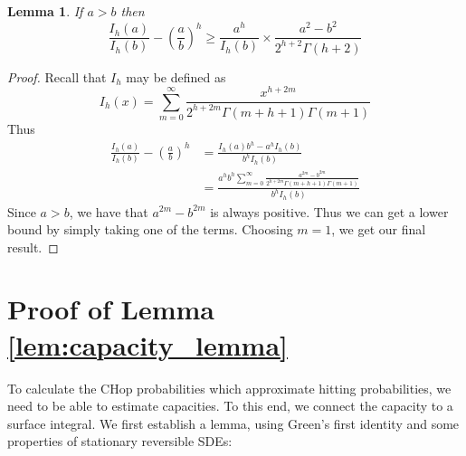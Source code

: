 \documentclass[english, aip, jcp, priprint, graphicx,floatfix]{revtex4-1}
\newtheorem{lemma}{Lemma}
\theoremstyle{plain}
\theoremstyle{definition}
\theoremstyle{plain}
\begin{document}
\begin{lemma}\label{lem:bessel}
If $a>b$ then
    \[
    \frac{I_h ( a)}{I_h (b)} - \left(\frac{a}{b} \right)^h 
    \geq
    \frac{a^h}{I_h(b)}\times\frac{a^{2} -b^{2}}{2^{h+2}\Gamma(h+2)}
    \]
\end{lemma}
\begin{proof}
Recall that $I_h$ may be defined as 
\[
I_h(x) = \sum_{m=0}^\infty \frac{x^{h+2m}}{2^{h+2m}\Gamma(m+h+1)\Gamma(m+1)}
\]
Thus
\begin{align*}
\frac{I_h ( a)}{I_h (b)} - \left(\frac{a}{b} \right)^h 
    &= \frac{I_h(a)b^h-a^hI_h(b)}{b^hI_h(b)}  \\
    &= \frac{a^hb^h\sum_{m=0}^\infty \frac{a^{2m} -b^{2m}}{2^{h+2m}\Gamma(m+h+1)\Gamma(m+1)}}{b^{h}I_h(b)}
\end{align*}
Since $a>b$, we have that $a^{2m} -b^{2m}$ is always positive.  Thus we can get a lower bound by simply taking one of the terms.  Choosing $m=1$, we get our final result.
\end{proof}

                                                            


\section{Proof of Lemma \ref{lem:capacity_lemma}}\label{sec:proof_lemma}

To calculate the CHop probabilities which approximate hitting probabilities, we need to be able to estimate capacities.  To this end, we connect the capacity to a surface integral. We first establish a lemma, using Green's first identity and some properties of stationary reversible SDEs:
\end{document}

